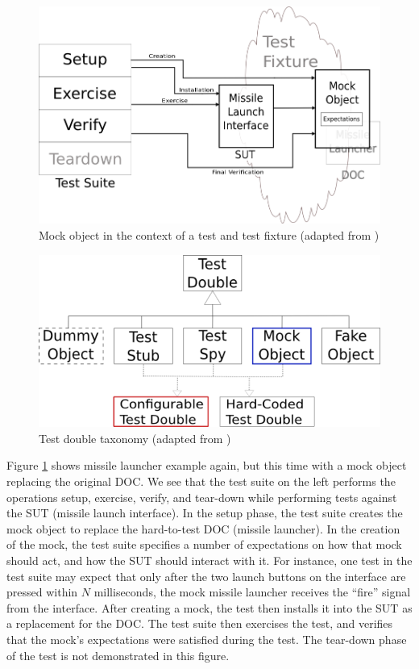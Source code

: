 \documentclass[proposal]{softeng}
\begin{document}
\begin{figure}
  \centering
  \includegraphics[scale=.45]{img/missile_launch3.png}
  \caption{Mock object in the context of a test and test fixture
    (adapted from \cite{meszaros:xunit})}
  \label{fig:missile_mock}
\end{figure}

\begin{figure}
  \centering
  \includegraphics[scale=.7]{img/test_double_taxonomy.png}
  \caption{Test double taxonomy (adapted from \cite{meszaros:xunit})}
  \label{fig:taxonomy}
\end{figure}

Figure \ref{fig:missile_mock} shows missile launcher example again, but
this time with a mock object replacing the original DOC. We see that
the test suite on the left performs the operations setup, exercise,
verify, and tear-down while performing tests against the SUT (missile
launch interface). In the setup phase, the test suite creates the mock
object to replace the hard-to-test DOC (missile launcher). In the
creation of the mock, the test suite specifies a number of
expectations on how that mock should act, and how the SUT should
interact with it. For instance, one test in the test suite may expect
that only after the two launch buttons on the interface are pressed
within $N$ milliseconds, the mock missile launcher receives the
``fire'' signal from the interface. After creating a mock, the test
then installs it into the SUT as a replacement for the DOC. The test
suite then exercises the test, and verifies that the mock's
expectations were satisfied during the test. The tear-down phase of the
test is not demonstrated in this figure.
\end{document}
